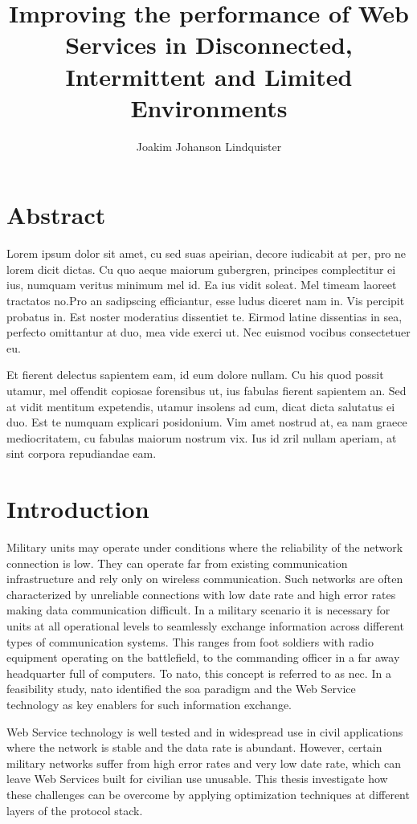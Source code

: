 \documentclass[USenglish]{ifimaster}
\title{Improving the performance of Web Services in Disconnected, Intermittent
and Limited Environments}
\author{Joakim Johanson Lindquister}
\begin{document}
\ififorside{}

\chapter*{Abstract}

Lorem ipsum dolor sit amet, cu sed suas apeirian, decore iudicabit at per, pro
ne lorem dicit dictas. Cu quo aeque maiorum gubergren, principes complectitur ei
ius, numquam veritus minimum mel id. Ea ius vidit soleat. Mel timeam laoreet
tractatos no.Pro an sadipscing efficiantur, esse ludus diceret nam in. Vis
percipit probatus in. Est noster moderatius dissentiet te. Eirmod latine
dissentias in sea, perfecto omittantur at duo, mea vide exerci ut. Nec euismod
vocibus consectetuer eu.

Et fierent delectus sapientem eam, id eum dolore nullam. Cu his quod possit
utamur, mel offendit copiosae forensibus ut, ius fabulas fierent sapientem an.
Sed at vidit mentitum expetendis, utamur insolens ad cum, dicat dicta salutatus
ei duo. Est te numquam explicari posidonium. Vim amet nostrud at, ea nam graece
mediocritatem, cu fabulas maiorum nostrum vix. Ius id zril nullam aperiam, at
sint corpora repudiandae eam.

\tableofcontents
\listoftables
\listoffigures

\pagebreak


\chapter{Introduction}

Military units may operate under conditions where the reliability of the network
connection is low. They can operate far from existing communication
infrastructure and rely only on wireless communication. Such networks are often
characterized by unreliable connections with low date rate and high error rates
making data communication difficult. In a military scenario it is necessary for
units at all operational levels to seamlessly exchange information across
different types of communication systems. This ranges from foot soldiers with
radio equipment operating on the battlefield, to the commanding officer in a far
away headquarter full of computers. To \gls{nato}, this concept is referred to
as \gls{nec}. In a feasibility study, \gls{nato} identified the \gls{soa}
paradigm and the Web Service technology as key enablers\cite{nnec-study} for
such information exchange.

Web Service technology is well tested and in widespread use in civil
applications where the network is stable and the data rate is abundant. However,
certain military networks suffer from high error rates and very low date rate,
which can leave Web Services built for civilian use unusable. This thesis
investigate how these challenges can be overcome by applying optimization
techniques at different layers of the protocol stack.
\end{document}
